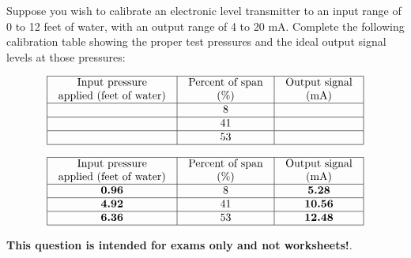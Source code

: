 

Suppose you wish to calibrate an electronic level transmitter to an input range of 0 to 12 feet of water, with an output range of 4 to 20 mA.  Complete the following calibration table showing the proper test pressures and the ideal output signal levels at those pressures:


$$\vbox{\offinterlineskip
\halign{\strut
\vrule \quad\hfil # \ \hfil & 
\vrule \quad\hfil # \ \hfil & 
\vrule \quad\hfil # \ \hfil \vrule \cr
\noalign{\hrule}
%
Input pressure & Percent of span & Output signal \cr
%
applied (feet of water) & (\%) & (mA) \cr
%
\noalign{\hrule}
%
 & 8 &  \cr
%
\noalign{\hrule}
%
 & 41 &  \cr
%
\noalign{\hrule}
%
 & 53 & \cr
%
\noalign{\hrule}
} %
}$$ %









$$\vbox{\offinterlineskip
\halign{\strut
\vrule \quad\hfil # \ \hfil & 
\vrule \quad\hfil # \ \hfil & 
\vrule \quad\hfil # \ \hfil \vrule \cr
\noalign{\hrule}
%
Input pressure & Percent of span & Output signal \cr
%
applied (feet of water) & (\%) & (mA) \cr
%
\noalign{\hrule}
%
{\bf 0.96} & 8 & {\bf 5.28} \cr
%
\noalign{\hrule}
%
{\bf 4.92} & 41 & {\bf 10.56} \cr
%
\noalign{\hrule}
%
{\bf 6.36} & 53 & {\bf 12.48} \cr
%
\noalign{\hrule}
} %
}$$ %







{\bf This question is intended for exams only and not worksheets!}.




